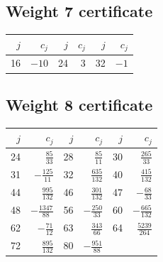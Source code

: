 \documentclass[11pt,letterpaper]{article}
\numberwithin{equation}{section}
\theoremstyle{definition}\newtheorem{definition}[theorem]{Definition}
\theoremstyle{remark}\newtheorem{remark}[theorem]{Remark}
\begin{document}
\subsection*{Weight 7 certificate}
\begin{center}
\small
\begin{tabular}{rr@{\qquad}rr@{\qquad}rr}
\toprule
$j$&$c_j$&$j$&$c_j$&$j$&$c_j$\\
\midrule

16&$-10$&24&$3$&32&$-1$\\[3pt]

\bottomrule
\end{tabular}
\end{center}

\subsection*{Weight 8 certificate}
\begin{center}
\small
\begin{tabular}{rr@{\qquad}rr@{\qquad}rr}
\toprule
$j$&$c_j$&$j$&$c_j$&$j$&$c_j$\\
\midrule

24&$\frac{85}{33}$&28&$\frac{85}{11}$&30&$\frac{265}{33}$\\[3pt]

31&$- \frac{125}{11}$&32&$\frac{635}{132}$&40&$\frac{415}{132}$\\[3pt]

44&$\frac{995}{132}$&46&$\frac{301}{132}$&47&$- \frac{68}{33}$\\[3pt]

48&$- \frac{1347}{88}$&56&$- \frac{250}{33}$&60&$- \frac{665}{132}$\\[3pt]

62&$- \frac{71}{12}$&63&$\frac{343}{66}$&64&$\frac{5239}{264}$\\[3pt]

72&$\frac{895}{132}$&80&$- \frac{951}{88}$&&\\[3pt]

\bottomrule
\end{tabular}
\end{center}
\end{document}
